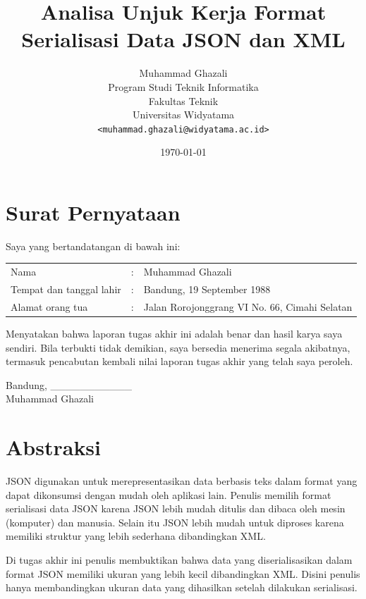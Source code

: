 \documentclass[a4paper, 12pt, oneside]{report}
\title{\textbf{Analisa Unjuk Kerja Format Serialisasi Data JSON dan XML}}
\author{
Muhammad Ghazali\\
Program Studi Teknik Informatika\\
Fakultas Teknik\\
Universitas Widyatama
\\\texttt{<muhammad.ghazali@widyatama.ac.id>}
}
\date{\today}
\begin{document}
\maketitle

\chapter*{Surat Pernyataan}

\onehalfspacing Saya yang bertandatangan di bawah ini:

\begin{tabular}{lll}
Nama & : & Muhammad Ghazali\\
Tempat dan tanggal lahir & : & Bandung, 19 September 1988\\
Alamat orang tua & : & Jalan Rorojonggrang VI No. 66, Cimahi Selatan\\
\end{tabular}

\onehalfspacing Menyatakan bahwa laporan tugas akhir ini adalah benar dan hasil karya saya sendiri. Bila terbukti tidak demikian, saya bersedia menerima segala akibatnya, termasuk pencabutan kembali nilai laporan tugas akhir yang telah saya peroleh.

\begin{flushright}
Bandung, \_\_\_\_\_\_\_\_\_\_\_
\\[1in] Muhammad Ghazali

\end{flushright}

\chapter*{Abstraksi}

\onehalfspacing JSON digunakan untuk merepresentasikan data berbasis teks dalam format yang dapat dikonsumsi dengan mudah oleh aplikasi lain. Penulis memilih format serialisasi data JSON karena JSON lebih mudah ditulis dan dibaca oleh mesin (komputer) dan manusia. Selain itu JSON lebih mudah untuk diproses karena memiliki struktur yang lebih sederhana dibandingkan XML\cite{json-fat-free}\cite{json-vs-xml-debate}. 

\onehalfspacing Di tugas akhir ini penulis membuktikan bahwa data yang diserialisasikan dalam format JSON memiliki ukuran yang lebih kecil dibandingkan XML. Disini penulis hanya membandingkan ukuran data yang dihasilkan setelah dilakukan serialisasi.
\end{document}
